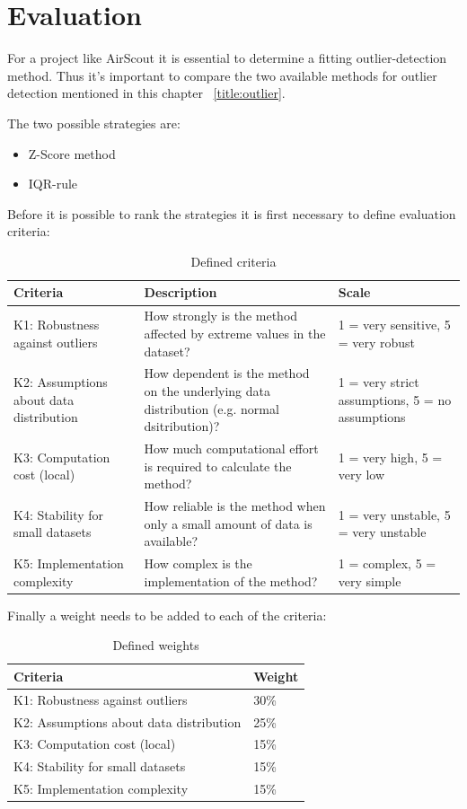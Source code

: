 \chapter{Evaluation}
For a project like AirScout it is essential to determine a fitting outlier-detection method. Thus it's important to compare the two available methods for outlier detection mentioned in this chapter ~\ref{title:outlier}.

The two possible strategies are:
\begin{itemize}
    \item Z-Score method
    \item IQR-rule
\end{itemize}

Before it is possible to rank the strategies it is first necessary to define evaluation criteria:
\begin{table}[H]
    \centering
    \begin{tabular}{|p{4.5cm}|p{4.5cm}|p{5cm}|}
    \hline
   Criteria & Description & Scale \\
   \hline
   K1: Robustness against outliers & How strongly is the method affected by extreme values in the dataset? & 1 = very sensitive, 5 = very robust\\
   \hline
   K2: Assumptions about data distribution & How dependent is the method on the underlying data distribution (e.g. normal dsitribution)? & 1 = very strict assumptions, 5 = no assumptions\\
   \hline
   K3: Computation cost (local) & How much computational effort is required to calculate the method? & 1 = very high, 5 = very low\\
   \hline
   K4: Stability for small datasets & How reliable is the method when only a small amount of data is available? & 1 = very unstable, 5 = very unstable\\
   \hline
   K5: Implementation complexity & How complex is the implementation of the method? & 1 = complex, 5 = very simple\\
   \hline
    \end{tabular}
    \caption{Defined criteria}
    \label{tab:criteria}
\end{table}

Finally a weight needs to be added to each of the criteria:
\begin{table}[H]
    \centering
    \begin{tabular}{|p{8cm}|p{2cm}|}
    \hline
    Criteria & Weight\\
    \hline
       K1: Robustness against outliers & 30\%\\
       \hline 
       K2: Assumptions about data distribution & 25\%\\
       \hline
       K3: Computation cost (local) & 15\%\\
       \hline
       K4: Stability for small datasets & 15\%\\
       \hline
       K5: Implementation complexity & 15\%\\
       \hline
    \end{tabular}
    \caption{Defined weights}
    \label{tab:weights}
\end{table}

